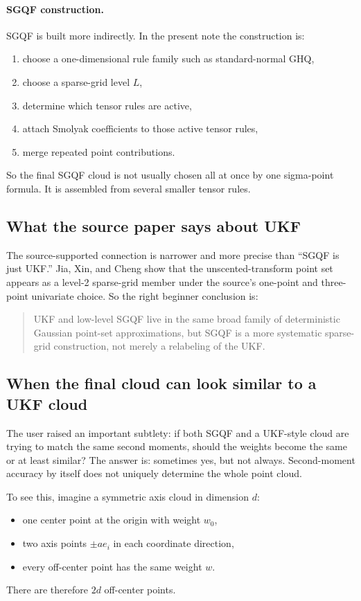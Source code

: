 \documentclass[11pt]{article}
\begin{document}
\paragraph{SGQF construction.}
SGQF is built more indirectly.  In the present note the construction is:
\begin{enumerate}[leftmargin=0.28in]
  \item choose a one-dimensional rule family such as standard-normal GHQ,
  \item choose a sparse-grid level \(L\),
  \item determine which tensor rules are active,
  \item attach Smolyak coefficients to those active tensor rules,
  \item merge repeated point contributions.
\end{enumerate}
So the final SGQF cloud is not usually chosen all at once by one sigma-point
formula.  It is assembled from several smaller tensor rules.

\subsection{What the source paper says about UKF}

The source-supported connection is narrower and more precise than ``SGQF is just
UKF.''  Jia, Xin, and Cheng show that the unscented-transform point set appears
as a level-2 sparse-grid member under the source's one-point and three-point
univariate choice.  So the right beginner conclusion is:
\begin{quote}
UKF and low-level SGQF live in the same broad family of deterministic Gaussian
point-set approximations, but SGQF is a more systematic sparse-grid construction,
not merely a relabeling of the UKF.
\end{quote}

\subsection{When the final cloud can look similar to a UKF cloud}

The user raised an important subtlety: if both SGQF and a UKF-style cloud are
trying to match the same second moments, should the weights become the same or at
least similar?  The answer is: sometimes yes, but not always.  Second-moment
accuracy by itself does not uniquely determine the whole point cloud.

To see this, imagine a symmetric axis cloud in dimension \(d\):
\begin{itemize}[leftmargin=0.28in]
  \item one center point at the origin with weight \(w_0\),
  \item two axis points \(\pm a e_i\) in each coordinate direction,
  \item every off-center point has the same weight \(w\).
\end{itemize}
There are therefore \(2d\) off-center points.
\end{document}
